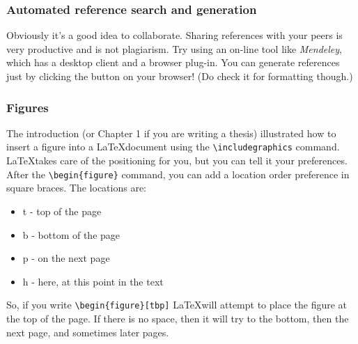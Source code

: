 \subsubsection{Automated reference search and generation}
\label{sec:jabref}

Obviously it's a good idea to collaborate. Sharing references with your peers is very productive and is not plagiarism. Try using an on-line tool like {\it Mendeley}, which has a desktop client and a browser plug-in. You can generate references just by clicking the button on your browser! (Do check it for formatting though.)




\subsubsection{Figures}
\label{sec:figures}

The introduction (or Chapter 1 if you are writing a thesis) illustrated how to insert a figure into a \LaTeX document using the \verb|\includegraphics| command.
\LaTeX takes care of the positioning for you, but you can tell it 
your preferences. After the \verb|\begin{figure}| command, you can
add a location order preference in square braces. The locations are:
\begin{itemize}
\item t - top of the page
\item b - bottom of the page
\item p - on the next page
\item h - here, at this point in the text
\end{itemize}
So, if you write \verb|\begin{figure}[tbp]| \LaTeX will attempt to 
place the figure at the top of the page. If there is no space, then 
it will try to the bottom, then the next page, and sometimes later
pages.

